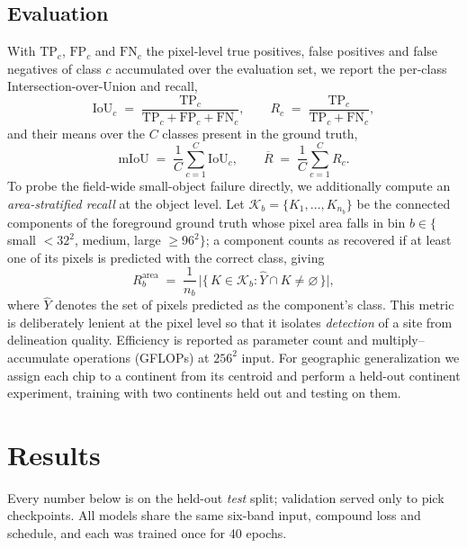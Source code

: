 \documentclass[review]{elsarticle}
\begin{document}
\subsection{Evaluation}\label{sec:eval}
With $\mathrm{TP}_c$, $\mathrm{FP}_c$ and $\mathrm{FN}_c$ the pixel-level true positives,
false positives and false negatives of class $c$ accumulated over the evaluation set, we
report the per-class Intersection-over-Union and recall,
\begin{equation}
\mathrm{IoU}_c \;=\; \frac{\mathrm{TP}_c}{\mathrm{TP}_c+\mathrm{FP}_c+\mathrm{FN}_c},
\qquad
R_c \;=\; \frac{\mathrm{TP}_c}{\mathrm{TP}_c+\mathrm{FN}_c},
\label{eq:iou}
\end{equation}
and their means over the $C$ classes present in the ground truth,
\begin{equation}
\mathrm{mIoU} \;=\; \frac{1}{C}\sum_{c=1}^{C}\mathrm{IoU}_c,
\qquad
\overline{R} \;=\; \frac{1}{C}\sum_{c=1}^{C} R_c .
\label{eq:miou}
\end{equation}
To probe the field-wide small-object failure directly, we additionally compute an
\emph{area-stratified recall} at the object level. Let
$\mathcal{K}_b=\{K_1,\dots,K_{n_b}\}$ be the connected components of the foreground ground
truth whose pixel area falls in bin $b\in\{$small $<32^2$, medium, large $\geq96^2\}$; a
component counts as recovered if at least one of its pixels is predicted with the correct
class, giving
\begin{equation}
R^{\mathrm{area}}_b \;=\; \frac{1}{n_b}\,
\bigl|\{\,K\in\mathcal{K}_b : \hat{Y}\cap K \neq \varnothing \,\}\bigr| ,
\label{eq:areastrat}
\end{equation}
where $\hat{Y}$ denotes the set of pixels predicted as the component's class. This metric
is deliberately lenient at the pixel level so that it isolates \emph{detection} of a site
from delineation quality. Efficiency is reported as parameter count and
multiply--accumulate operations (GFLOPs) at $256^2$ input. For geographic generalization
we assign each chip to a continent from its centroid and perform a held-out continent
experiment, training with two continents held out and testing on them.

\section{Results}\label{sec:results}
Every number below is on the held-out \emph{test} split; validation served only to pick
checkpoints. All models share the same six-band input, compound loss and schedule, and each
was trained once for \num{40} epochs.
\end{document}
